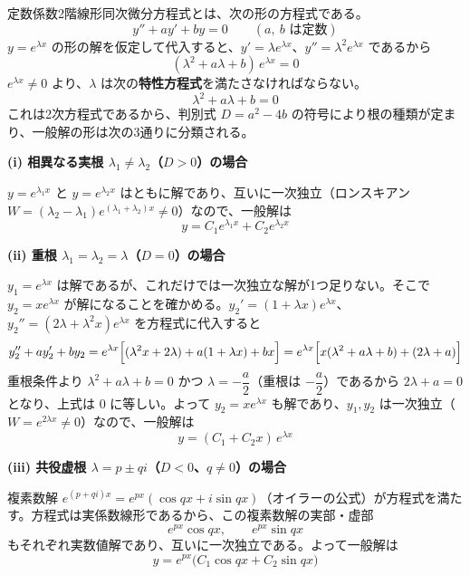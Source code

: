 \documentclass[a4paper,11pt]{article}
\begin{document}


\noindent
定数係数2階線形同次微分方程式とは、次の形の方程式である。
\[
y'' + a y' + b y = 0 \qquad (a,\ b \text{ は定数})
\]
$y = e^{\lambda x}$ の形の解を仮定して代入すると、$y' = \lambda e^{\lambda x}$、$y'' = \lambda^{2} e^{\lambda x}$ であるから
\[
(\lambda^{2} + a\lambda + b)\,e^{\lambda x} = 0
\]
$e^{\lambda x} \neq 0$ より、$\lambda$ は次の\textbf{特性方程式}を満たさなければならない。
\[
\lambda^{2} + a\lambda + b = 0
\]
これは2次方程式であるから、判別式 $D = a^{2} - 4b$ の符号により根の種類が定まり、一般解の形は次の3通りに分類される。

\medskip
\noindent
\textbf{(i) 相異なる実根 $\lambda_{1} \neq \lambda_{2}$（$D > 0$）の場合}

$y = e^{\lambda_{1}x}$ と $y = e^{\lambda_{2}x}$ はともに解であり、互いに一次独立（ロンスキアン $W = (\lambda_{2}-\lambda_{1})e^{(\lambda_{1}+\lambda_{2})x} \neq 0$）なので、一般解は
\[
y = C_{1}e^{\lambda_{1}x} + C_{2}e^{\lambda_{2}x}
\]

\medskip
\noindent
\textbf{(ii) 重根 $\lambda_{1} = \lambda_{2} = \lambda$（$D = 0$）の場合}

$y_{1} = e^{\lambda x}$ は解であるが、これだけでは一次独立な解が1つ足りない。そこで $y_{2} = x e^{\lambda x}$ が解になることを確かめる。$y_{2}' = (1+\lambda x)e^{\lambda x}$、$y_{2}'' = (2\lambda + \lambda^{2}x)e^{\lambda x}$ を方程式に代入すると
\[
y_{2}'' + a y_{2}' + b y_{2}
= e^{\lambda x}\Bigl[(\lambda^{2}x + 2\lambda) + a(1+\lambda x) + bx\Bigr]
= e^{\lambda x}\Bigl[x(\lambda^{2}+a\lambda+b) + (2\lambda + a)\Bigr]
\]
重根条件より $\lambda^{2}+a\lambda+b = 0$ かつ $\lambda = -\dfrac{a}{2}$（重根は $-\dfrac{a}{2}$）であるから $2\lambda + a = 0$ となり、上式は $0$ に等しい。よって $y_{2} = xe^{\lambda x}$ も解であり、$y_1, y_2$ は一次独立（$W = e^{2\lambda x} \neq 0$）なので、一般解は
\[
y = (C_{1} + C_{2}x)\,e^{\lambda x}
\]

\medskip
\noindent
\textbf{(iii) 共役虚根 $\lambda = p \pm qi$（$D < 0$、$q \neq 0$）の場合}

複素数解 $e^{(p+qi)x} = e^{px}(\cos qx + i\sin qx)$（オイラーの公式）が方程式を満たす。方程式は実係数線形であるから、この複素数解の実部・虚部
\[
e^{px}\cos qx, \qquad e^{px}\sin qx
\]
もそれぞれ実数値解であり、互いに一次独立である。よって一般解は
\[
y = e^{px}\bigl(C_{1}\cos qx + C_{2}\sin qx\bigr)
\]
\end{document}
